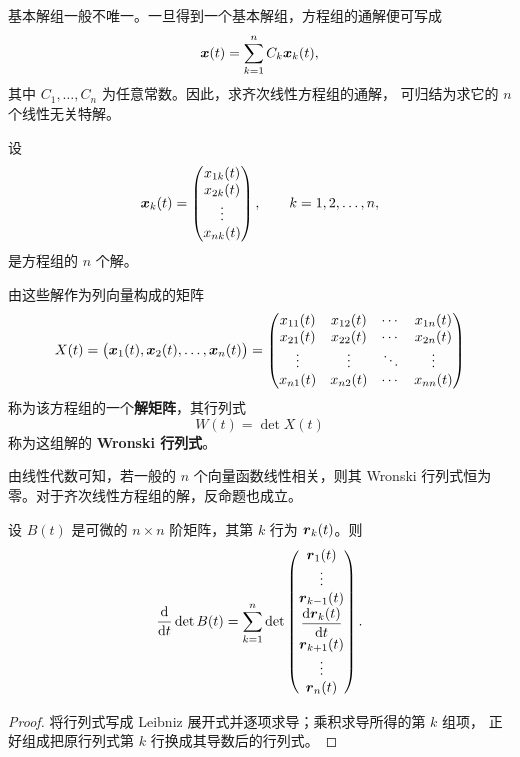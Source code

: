 基本解组一般不唯一。一旦得到一个基本解组，方程组的通解便可写成
\[
	\boldsymbol{x}(t)
	=\sum_{k=1}^{n}C_k\boldsymbol{x}_k(t),
\]
其中 $C_1,\ldots,C_n$ 为任意常数。因此，求齐次线性方程组的通解，
可归结为求它的 $n$ 个线性无关特解。

设
\[
	\boldsymbol{x}_k(t)=
	\begin{pmatrix}
		x_{1k}(t)\\
		x_{2k}(t)\\
		\vdots\\
		x_{nk}(t)
	\end{pmatrix},
	\qquad k=1,2,\ldots,n,
\]
是方程组的 $n$ 个解。

\begin{definition}\label{def:解矩阵与Wronski行列式}
	由这些解作为列向量构成的矩阵
	\[
		X(t)
		=\bigl(\boldsymbol{x}_1(t),\boldsymbol{x}_2(t),\ldots,\boldsymbol{x}_n(t)\bigr)
		=
		\begin{pmatrix}
			x_{11}(t) & x_{12}(t) & \cdots & x_{1n}(t)\\
			x_{21}(t) & x_{22}(t) & \cdots & x_{2n}(t)\\
			\vdots    & \vdots    & \ddots & \vdots\\
			x_{n1}(t) & x_{n2}(t) & \cdots & x_{nn}(t)
		\end{pmatrix}
	\]
	称为该方程组的一个\textbf{解矩阵}，其行列式
	\[
		W(t)=\det X(t)
	\]
	称为这组解的 \textbf{Wronski 行列式}。
\end{definition}

由线性代数可知，若一般的 $n$ 个向量函数线性相关，则其 Wronski
行列式恒为零。对于齐次线性方程组的解，反命题也成立。

\begin{lemma}\label{lem:行列式的导数}
	设 $B(t)$ 是可微的 $n\times n$ 阶矩阵，其第 $k$ 行为
	$\boldsymbol{r}_k(t)$。则
	\[
		\dfrac{\mathrm{d}}{\mathrm{d} t}\det B(t)
		=
		\sum_{k=1}^{n}
		\det
		\begin{pmatrix}
			\boldsymbol{r}_1(t)\\
			\vdots\\
			\boldsymbol{r}_{k-1}(t)\\
			\dfrac{\mathrm{d}\boldsymbol{r}_k(t)}{\mathrm{d} t}\\
			\boldsymbol{r}_{k+1}(t)\\
			\vdots\\
			\boldsymbol{r}_n(t)
		\end{pmatrix}.
	\]
\end{lemma}

\begin{proof}
	将行列式写成 Leibniz 展开式并逐项求导；乘积求导所得的第 $k$ 组项，
	正好组成把原行列式第 $k$ 行换成其导数后的行列式。
\end{proof}

